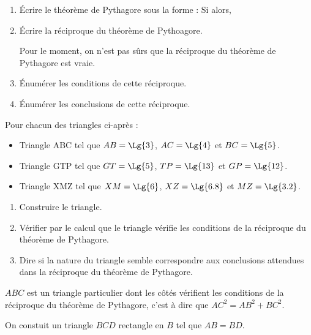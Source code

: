 \begin{activite}
    \begin{enumerate}
        \item Écrire le théorème de Pythagore sous la forme : \og Si \makebox[0.1\linewidth]{\dotfill} alors, \makebox[0.1\linewidth]{\dotfill} \fg
        \item Écrire la réciproque du théorème de Pythoagore.
        
        Pour le moment, on n'est pas sûrs que la réciproque du théorème de Pythagore est vraie.
        \item Énumérer les conditions de cette réciproque.
        \item Énumérer les conclusions de cette réciproque.
    \end{enumerate}

    \partie[Conjecture]
    Pour chacun des triangles ci-après :
    \begin{itemize}
        \item Triangle ABC tel que $AB=\Lg{3}$, $AC=\Lg{4}$ et $BC=\Lg{5}$.
        \item Triangle GTP tel que $GT=\Lg{5}$, $TP=\Lg{13}$ et $GP=\Lg{12}$.
        \item Triangle XMZ tel que $XM=\Lg{6}$, $XZ=\Lg{6.8}$ et $MZ=\Lg{3.2}$.
    \end{itemize}
    \begin{enumerate}
        \item Construire le triangle.
        \item Vérifier par le calcul que le triangle vérifie les conditions de la réciproque du théorème de Pythagore.
        \item Dire si la nature du triangle semble correspondre aux conclusions attendues dans la réciproque du théorème de Pythagore.
    \end{enumerate}

    \partie[Démonstration]
    $ABC$ est un triangle particulier dont les côtés vérifient les conditions de la réciproque du théorème de Pythagore, c'est à dire que $AC^2=AB^2+BC^2$.

    On constuit un triangle $BCD$ rectangle en $B$ tel que $AB=BD$.


\end{activite}
